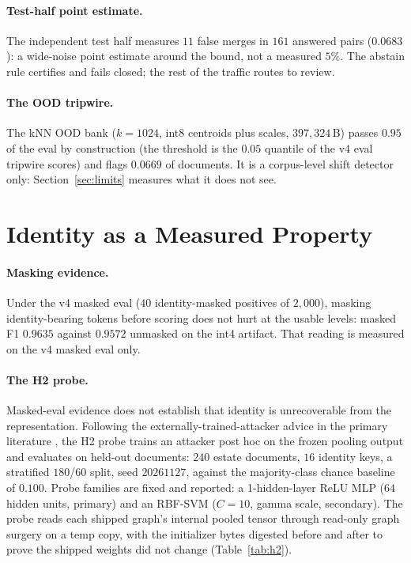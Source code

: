 \documentclass{article}
\begin{document}
\paragraph{Test-half point estimate.}
The independent test half measures $11$ false merges in $161$ answered pairs ($0.0683$): a wide-noise point estimate around the bound, not a measured $5\%$. The abstain rule certifies and fails closed; the rest of the traffic routes to review.

\paragraph{The OOD tripwire.}
The kNN OOD bank ($k{=}1024$, int8 centroids plus scales, $397{,}324$\,B) passes $0.95$ of the eval by construction (the threshold is the $0.05$ quantile of the v4 eval tripwire scores) and flags $0.0669$ of documents. It is a corpus-level shift detector only: Section~\ref{sec:limits} measures what it does not see.

\section{Identity as a Measured Property}
\label{sec:identity}

\paragraph{Masking evidence.}
Under the v4 masked eval ($40$ identity-masked positives of $2{,}000$), masking identity-bearing tokens before scoring does not hurt at the usable levels: masked F1 $0.9635$ against $0.9572$ unmasked on the int4 artifact. That reading is measured on the v4 masked eval only.

\paragraph{The H2 probe.}
Masked-eval evidence does not establish that identity is unrecoverable from the representation. Following the externally-trained-attacker advice in the primary literature \citep{elazar2018adversarial}, the H2 probe trains an attacker post hoc on the frozen pooling output and evaluates on held-out documents: $240$ estate documents, $16$ identity keys, a stratified $180$/$60$ split, seed $20261127$, against the majority-class chance baseline of $0.100$. Probe families are fixed and reported: a 1-hidden-layer ReLU MLP ($64$ hidden units, primary) and an RBF-SVM ($C{=}10$, gamma scale, secondary). The probe reads each shipped graph's internal pooled tensor through read-only graph surgery on a temp copy, with the initializer bytes digested before and after to prove the shipped weights did not change (Table~\ref{tab:h2}).
\end{document}

